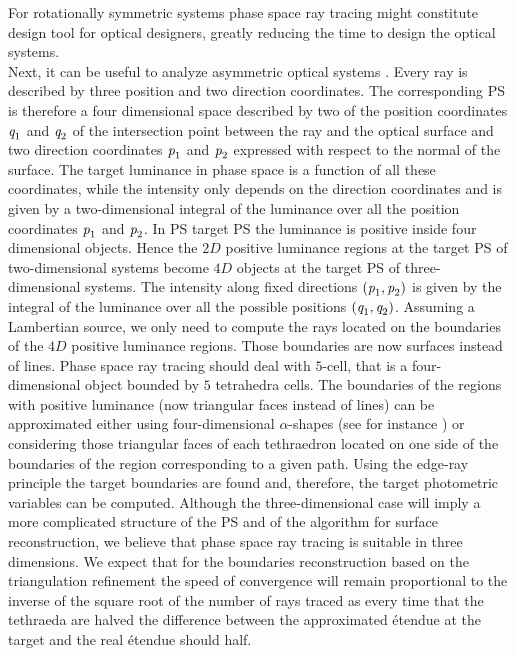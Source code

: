 For rotationally symmetric systems phase space ray tracing might constitute design tool for optical designers, greatly reducing the time to design the optical systems. 
\\ \indent  Next, it can be useful to analyze asymmetric optical systems \cite{ries1997performance}. Every ray is described by three position and two direction coordinates. The corresponding PS is therefore a four dimensional space described by two of the position coordinates $\textit{q}_1$ and $\textit{q}_2$ of the intersection point between the ray and the optical surface and two direction coordinates $\textit{p}_1$ and $\textit{p}_2$ expressed with respect to the normal of the surface. 
The target luminance in phase space is a function of all these coordinates, while the intensity only depends on the direction coordinates and is given by a two-dimensional integral of the luminance over all the position coordinates $\textit{p}_1$ and $\textit{p}_2$. In PS target PS the luminance is positive inside four dimensional objects. Hence the $2D$ positive luminance regions at the target PS of two-dimensional systems become $4D$ objects at the target PS of three-dimensional systems. The intensity along fixed directions $(\textit{p}_1, \textit{p}_2)$ is given by the integral of the luminance over all the possible positions $(\textit{q}_1, \textit{q}_2)$. Assuming a Lambertian source, we only need to compute the rays located on the boundaries of the $4D$ positive luminance regions. Those boundaries are now surfaces instead of lines. Phase space ray tracing should deal with $5$-cell, that is a four-dimensional object bounded by $5$ tetrahedra cells. The boundaries of the regions with positive luminance (now triangular faces instead of lines) can be approximated either using four-dimensional $\alpha$-shapes (see for instance \cite{cazals2005conformal, teichmann1998surface}) or considering those triangular faces of each tethraedron located on one side of the boundaries of the region corresponding to a given path. Using the edge-ray principle the target boundaries are found and, therefore, the target photometric variables can be computed. Although the three-dimensional case will imply a more complicated structure of the PS and of the algorithm for surface reconstruction, we believe that phase space ray tracing is suitable in three dimensions. 
We expect that for the boundaries reconstruction based on the triangulation refinement the speed of convergence will remain proportional to the inverse of the square root of the number of rays traced as every time that the tethraeda are halved the difference between the approximated \'{e}tendue at the target and the real \'{e}tendue should half.
